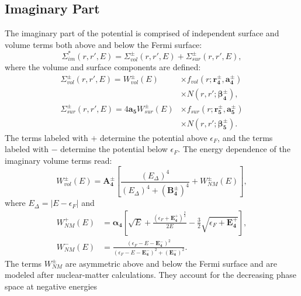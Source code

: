 \documentclass[twocolumn,secnumarabic,amssymb, nobibnotes, aps, prl,
superscriptaddress, nobalancelastpage, floatfix]{revtex4}
\begin{document}
{\subsection{Imaginary Part}
The imaginary part of the potential is comprised of independent surface and volume terms
both above and below the Fermi surface:
\begin{equation}
    \Sigma_{im}^{*}(r,r',E) =
    \Sigma_{vol}^{\pm}(r,r',E)
    + \Sigma_{sur}^{\pm}(r,r',E),
\end{equation}
where the volume and surface components are defined:
\begin{equation}
    \begin{split}
        \Sigma_{vol}^{\pm}(r,r',E)
        = W_{vol}^{\pm}(E) & {\times}f_{vol}(r; \mathbf{r_{4}^{\pm}},
        \mathbf{a_{4}^{\pm}})\\
        & {\times}N(r,r'; \boldsymbol{\beta_{4}^{\pm}}),\\
        \Sigma_{sur}^{\pm}(r,r',E)
        = 4\mathbf{a_{5}}W_{sur}^{\pm}(E) & {\times}f_{sur}(r;
        \mathbf{r_{5}^{\pm}}, \mathbf{a_{5}^{\pm}})\\
        & {\times} N(r,r';\boldsymbol{\beta_{5}^{\pm}}).
    \end{split}
\end{equation}
The terms labeled with $+$ determine the potential above $\epsilon_{F}$, and the terms labeled
with $-$ determine the potential below $\epsilon_{F}$.
The energy dependence of the imaginary volume terms read:
\begin{equation} \label{ImagVolume}
    W_{vol}^{\pm}(E) = \mathbf{A_{4}^{\pm}}\left[\frac{(E_{\Delta})^{4}}
    {(E_{\Delta})^{4}+(\mathbf{B_{4}^{\pm}})^{4}} + W_{NM}^{\pm}(E)\right],
\end{equation}
where $E_{\Delta} = |E-\epsilon_{F}|$ and
\begin{equation}
    \begin{split}
        W_{NM}^{+}(E) & = {\boldsymbol{\alpha_{4}}}\left[\sqrt{E} +
            \frac{(\epsilon_{F}+\mathbf{E^{+}_{4}})^{\frac{3}{2}}}{2E}
        -\frac{3}{2}\sqrt{\epsilon_{F}+\mathbf{E^{+}_{4}}}\right],\\
        W_{NM}^{-}(E) & = \frac{(\epsilon_{F}-E-\mathbf{E_{4}^{-}})^{2}}
        {(\epsilon_{F}-E-\mathbf{E_{4}^{-}})^{2}+(\mathbf{E_{4}^{-}})^{2}}.
        \end{split}
    \end{equation}
The terms $W_{NM}^{\pm}$ are asymmetric above and below the Fermi surface and are modeled after
nuclear-matter calculations. They account for the decreasing phase space at negative energies
}
\end{document}
